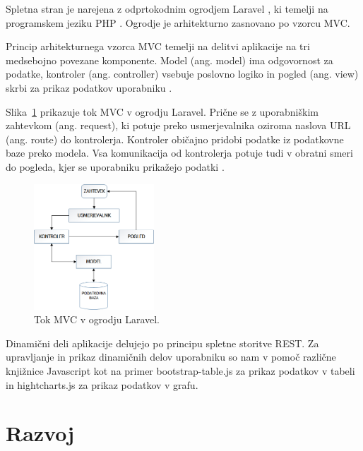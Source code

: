 \documentclass[a4paper, 12pt]{book}
\begin{document}
Spletna stran je narejena z odprtokodnim ogrodjem Laravel \cite{laravel-main-page}, ki temelji na programskem jeziku PHP \cite{php-jezik}. Ogrodje je arhitekturno zasnovano po vzorcu MVC. 

Princip arhitekturnega vzorca MVC temelji na delitvi aplikacije na tri medsebojno povezane komponente. Model (ang. model) ima odgovornost za podatke, kontroler (ang. controller) vsebuje poslovno logiko in pogled (ang. view) skrbi za prikaz podatkov uporabniku \cite{mvc-arhitektura}.

Slika~\ref{mvc-laravel} prikazuje tok MVC v ogrodju Laravel. Prične se z uporabniškim zahtevkom (ang. request), ki potuje preko usmerjevalnika oziroma naslova URL (ang. route) do kontrolerja. Kontroler običajno pridobi podatke iz podatkovne baze preko modela. Vsa komunikacija od kontrolerja potuje tudi v obratni smeri do pogleda, kjer se uporabniku prikažejo podatki \cite{poglavje_laravel_mvc}. 

\begin{figure}[h]
\begin{center}
\includegraphics[width=0.4\textwidth]{slike/Laravel-MVC.png}
\end{center}
\caption{Tok MVC v ogrodju Laravel.}
\label{mvc-laravel}
\end{figure}

\clearpage

Dinamični deli aplikacije delujejo po principu spletne storitve REST. Za upravljanje in prikaz dinamičnih delov uporabniku so nam v pomoč različne knjižnice Javascript kot na primer bootstrap-table.js \cite{bootstraptable} za prikaz podatkov v tabeli in hightcharts.js \cite{hightchars-js} za prikaz podatkov v grafu.






\chapter{Razvoj}
\label{razvoj}
\end{document}

